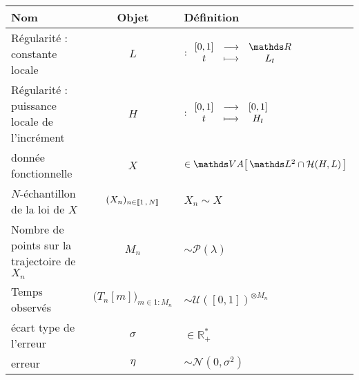 \begin{table}[H]
\centering
	\noindent\begin{tabularx}{\textwidth}{XcX}
		\toprule
		\textbf{Nom}                                 & \textbf{Objet}                              & \textbf{Définition}                                                                                                \\
		\midrule
		Régularité : constante locale                & $L$                                         & $: \func{[0,1]}{\mathds R}{t}{L_t}$                                                                                \\
		Régularité : puissance locale de l'incrément & $H$                                         & $: \begin{array}{ccc} [0,1] &\longrightarrow& [0,1] \\ t &\longmapsto& H_t \end{array}$                                                                                    \\
		donnée fonctionnelle                         & $X$                                         & $\in \VA{ \mathds L^2 \cap \mathcal H(H, L) }$                                                                     \\
		$N$-échantillon de la loi de $X$             & $(X_n)_{n \in \llbracket 1 \, , \, N \rrbracket}$           & $X_n \sim X$                                                                                                       \\
		\midrule
		Nombre de points sur la trajectoire de $X_n$ & $M_n$                                       & $\sim \mathcal P(\lambda)$                                                                                         \\
		Temps observés                               & $\bigl(T_n[m]\bigr)_{m \in 1:M_n}$          & $\sim \mathcal U( [0,1] )^{\otimes M_n}$                                                                           \\
		\midrule
		écart type de l'erreur                       & $\sigma$                                    & $\in \mathds R_+^*$                                                                                                \\
		erreur                                       & $\eta$                                      & $\sim \mathcal N(0, \sigma^2)$                                                                                     \\

\end{tabularx}
\end{table}
